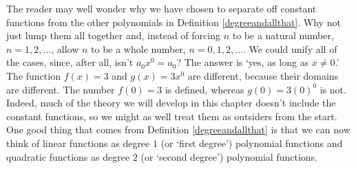 
\smallskip

The reader may well wonder why we have chosen to separate off constant functions from the other polynomials in Definition \ref{degreeandallthat}.  Why not just lump them all together and, instead of forcing $n$ to be a natural number, $n = 1, 2, \ldots$, allow $n$ to be a whole number, $n = 0, 1, 2, \ldots$.  We could unify all of the cases, since, after all, isn't $a_{0}x^{0} = a_{0}$?  The answer is `yes, as long as $x\neq 0$.'  The function $f(x) = 3$ and $g(x) = 3x^{0}$ are different, because their domains are different.  The number $f(0) = 3$ is defined, whereas $g(0) = 3(0)^{0}$ is not.   \label{indeterminantformone} Indeed, much of the theory we will develop in this chapter doesn't include the constant functions, so we might as well treat them as outsiders from the start.  One good thing that comes from Definition \ref{degreeandallthat} is that we can now think of linear functions as degree $1$ (or `first degree') polynomial functions and quadratic functions as degree $2$ (or `second degree') polynomial functions.

